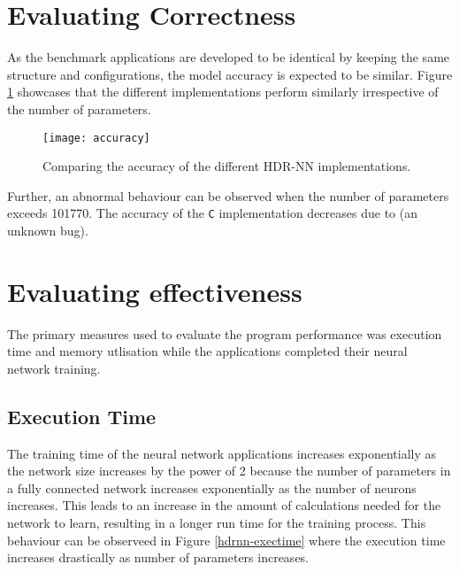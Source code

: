 
\section{Evaluating Correctness}

As the benchmark applications are developed to be identical by keeping the same structure and configurations, the model accuracy is expected to be similar. Figure \ref{hdrnn-accuracy} showcases that the different implementations perform similarly irrespective of the number of parameters.


\begin{figure}[!ht]
	\centering
	\texttt{[image: accuracy]}
	\caption[HDR-NN Accuracy]{Comparing the accuracy of the different HDR-NN implementations.}
	\label{hdrnn-accuracy}
\end{figure}

Further, an abnormal behaviour can be observed when the number of parameters exceeds 101770. The accuracy of the \texttt{C} implementation decreases due to (an unknown bug).



\section{Evaluating effectiveness}

The primary measures used to evaluate the program performance was execution time and memory utlisation while the applications completed their neural network training.

\subsection{Execution Time}
The training time of the neural network applications increases exponentially as the network size increases by the power of 2 because the number of parameters in a fully connected network increases exponentially as the number of neurons increases. This leads to an increase in the amount of calculations needed for the network to learn, resulting in a longer run time for the training process. This behaviour can be observeed in Figure \ref{hdrnn-exectime} where the execution time increases drastically as number of parameters increases.

